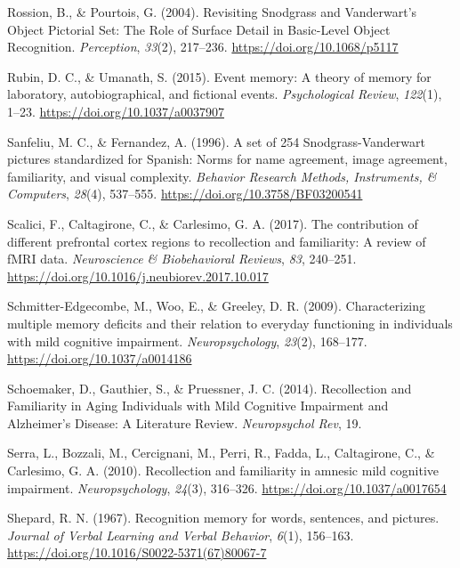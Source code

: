 \documentclass[
  11pt,
]{article}
\begin{document}
\leavevmode\hypertarget{ref-rossion2004}{}%
Rossion, B., \& Pourtois, G. (2004). Revisiting Snodgrass and
Vanderwart's Object Pictorial Set: The Role of Surface Detail in
Basic-Level Object Recognition. \emph{Perception}, \emph{33}(2),
217--236. \url{https://doi.org/10.1068/p5117}

\leavevmode\hypertarget{ref-rubin2015}{}%
Rubin, D. C., \& Umanath, S. (2015). Event memory: A theory of memory
for laboratory, autobiographical, and fictional events.
\emph{Psychological Review}, \emph{122}(1), 1--23.
\url{https://doi.org/10.1037/a0037907}

\leavevmode\hypertarget{ref-sanfeliu1996}{}%
Sanfeliu, M. C., \& Fernandez, A. (1996). A set of 254
Snodgrass-Vanderwart pictures standardized for Spanish: Norms for name
agreement, image agreement, familiarity, and visual complexity.
\emph{Behavior Research Methods, Instruments, \& Computers},
\emph{28}(4), 537--555. \url{https://doi.org/10.3758/BF03200541}

\leavevmode\hypertarget{ref-scalici2017}{}%
Scalici, F., Caltagirone, C., \& Carlesimo, G. A. (2017). The
contribution of different prefrontal cortex regions to recollection and
familiarity: A review of fMRI data. \emph{Neuroscience \& Biobehavioral
Reviews}, \emph{83}, 240--251.
\url{https://doi.org/10.1016/j.neubiorev.2017.10.017}

\leavevmode\hypertarget{ref-schmitter-edgecombe2009}{}%
Schmitter-Edgecombe, M., Woo, E., \& Greeley, D. R. (2009).
Characterizing multiple memory deficits and their relation to everyday
functioning in individuals with mild cognitive impairment.
\emph{Neuropsychology}, \emph{23}(2), 168--177.
\url{https://doi.org/10.1037/a0014186}

\leavevmode\hypertarget{ref-schoemaker2014}{}%
Schoemaker, D., Gauthier, S., \& Pruessner, J. C. (2014). Recollection
and Familiarity in Aging Individuals with Mild Cognitive Impairment and
Alzheimer's Disease: A Literature Review. \emph{Neuropsychol Rev}, 19.

\leavevmode\hypertarget{ref-serra2010}{}%
Serra, L., Bozzali, M., Cercignani, M., Perri, R., Fadda, L.,
Caltagirone, C., \& Carlesimo, G. A. (2010). Recollection and
familiarity in amnesic mild cognitive impairment.
\emph{Neuropsychology}, \emph{24}(3), 316--326.
\url{https://doi.org/10.1037/a0017654}

\leavevmode\hypertarget{ref-shepard1967}{}%
Shepard, R. N. (1967). Recognition memory for words, sentences, and
pictures. \emph{Journal of Verbal Learning and Verbal Behavior},
\emph{6}(1), 156--163.
\url{https://doi.org/10.1016/S0022-5371(67)80067-7}
\end{document}
